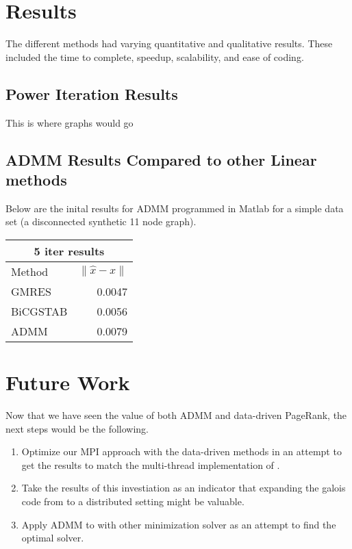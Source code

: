 \documentclass[letterpaper,12pt,onecolumn]{article}
\begin{document}
\section{Results}
The different methods had varying quantitative and qualitative results. These included the time to complete, speedup, scalability, and ease of coding. 

\subsection{Power Iteration Results}
This is where graphs would go 


\subsection{ADMM Results Compared to other Linear methods}
Below are the inital results for ADMM programmed in Matlab for a simple data set (a disconnected synthetic 11 node graph). 

\begin{center}
\begin{tabular}{l || r}
	\hline\hline
	\multicolumn{2}{c}{5 iter results} \\
	\hline\hline
	Method  & $\|\hat{x} - x\| $ \\
	\hline
	GMRES & 0.0047  \\
	BiCGSTAB & 0.0056  \\
	ADMM & 0.0079  \\
\end{tabular}
\end{center}


\section{Future Work}

Now that we have seen the value of both ADMM and data-driven PageRank, the next steps would be the following.

\begin{enumerate}
  \item Optimize our MPI approach with the data-driven methods in an attempt to get the results to match the multi-thread implementation of \cite{Joyce}.
  \item Take the results of this investiation as an indicator that expanding the galois code from \cite{Joyce} to a distributed setting might be valuable.
  \item Apply ADMM to with other minimization solver as an attempt to find the optimal solver.
\end{enumerate}
\end{document}
